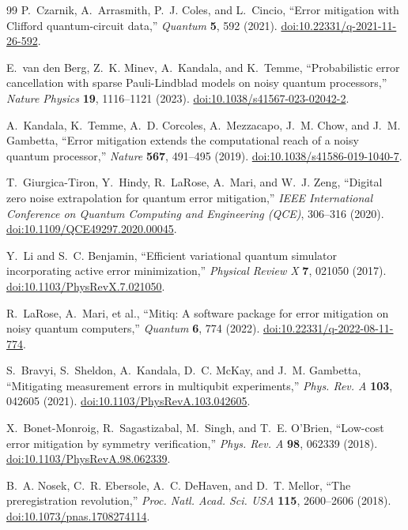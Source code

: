 \documentclass[a4paper,onecolumn,unpublished,nopdfoutputerror]{quantumarticle}
\theoremstyle{plain}
\theoremstyle{definition}
\newcommand{\1}{\mathbf{1}}
\begin{document}
\begin{thebibliography}{99}
P.~Czarnik, A.~Arrasmith, P.~J. Coles, and L.~Cincio,
``Error mitigation with Clifford quantum-circuit data,''
\emph{Quantum} \textbf{5}, 592 (2021). \href{https://doi.org/10.22331/q-2021-11-26-592}{doi:10.22331/q-2021-11-26-592}.

E.~van den Berg, Z.~K. Minev, A.~Kandala, and K.~Temme,
``Probabilistic error cancellation with sparse Pauli-Lindblad models on noisy quantum processors,''
\emph{Nature Physics} \textbf{19}, 1116--1121 (2023). \href{https://doi.org/10.1038/s41567-023-02042-2}{doi:10.1038/s41567-023-02042-2}.

A.~Kandala, K.~Temme, A.~D. Corcoles, A.~Mezzacapo, J.~M. Chow, and J.~M. Gambetta,
``Error mitigation extends the computational reach of a noisy quantum processor,''
\emph{Nature} \textbf{567}, 491--495 (2019). \href{https://doi.org/10.1038/s41586-019-1040-7}{doi:10.1038/s41586-019-1040-7}.

T.~Giurgica-Tiron, Y.~Hindy, R.~LaRose, A.~Mari, and W.~J. Zeng,
``Digital zero noise extrapolation for quantum error mitigation,''
\emph{IEEE International Conference on Quantum Computing and Engineering (QCE)}, 306--316 (2020). \href{https://doi.org/10.1109/QCE49297.2020.00045}{doi:10.1109/QCE49297.2020.00045}.

Y.~Li and S.~C. Benjamin,
``Efficient variational quantum simulator incorporating active error minimization,''
\emph{Physical Review X} \textbf{7}, 021050 (2017). \href{https://doi.org/10.1103/PhysRevX.7.021050}{doi:10.1103/PhysRevX.7.021050}.

R.~LaRose, A.~Mari, et al.,
``Mitiq: A software package for error mitigation on noisy quantum computers,''
\emph{Quantum} \textbf{6}, 774 (2022). \href{https://doi.org/10.22331/q-2022-08-11-774}{doi:10.22331/q-2022-08-11-774}.

S.~Bravyi, S.~Sheldon, A.~Kandala, D.~C. McKay, and J.~M. Gambetta,
``Mitigating measurement errors in multiqubit experiments,''
\emph{Phys. Rev. A} \textbf{103}, 042605 (2021). \href{https://doi.org/10.1103/PhysRevA.103.042605}{doi:10.1103/PhysRevA.103.042605}.

X.~Bonet-Monroig, R.~Sagastizabal, M.~Singh, and T.~E. O'Brien,
``Low-cost error mitigation by symmetry verification,''
\emph{Phys. Rev. A} \textbf{98}, 062339 (2018). \href{https://doi.org/10.1103/PhysRevA.98.062339}{doi:10.1103/PhysRevA.98.062339}.

B.~A. Nosek, C.~R. Ebersole, A.~C. DeHaven, and D.~T. Mellor,
``The preregistration revolution,''
\emph{Proc. Natl. Acad. Sci. USA} \textbf{115}, 2600--2606 (2018). \href{https://doi.org/10.1073/pnas.1708274114}{doi:10.1073/pnas.1708274114}.

\end{thebibliography}
\end{document}
